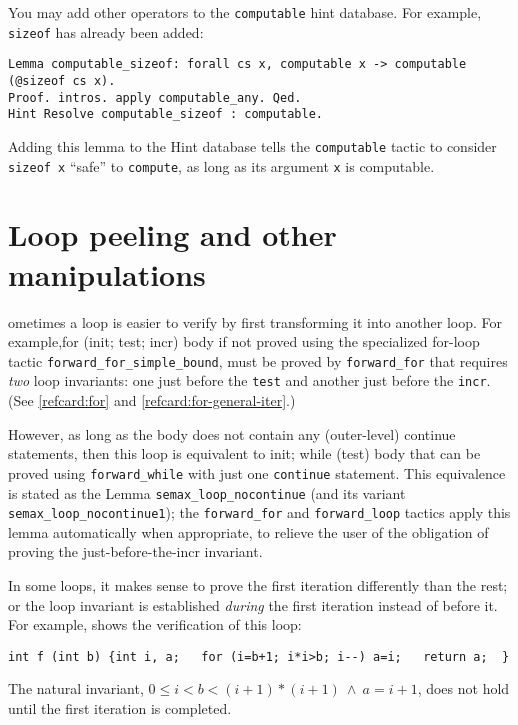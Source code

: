 \documentclass[12pt,fleqn,openany,oneside,showtrims]{memoir}
\newcommand{\ychapter}[2]{\chapter[#1]{#1}}
\begin{document}
You may add other operators to the \lstinline{computable} hint database.  For example, \lstinline{sizeof} has already been added:

\begin{lstlisting}
Lemma computable_sizeof: forall cs x, computable x -> computable (@sizeof cs x).
Proof. intros. apply computable_any. Qed.
Hint Resolve computable_sizeof : computable.
\end{lstlisting}

Adding this lemma to the Hint database tells the \lstinline{computable} tactic to consider \lstinline{sizeof x} ``safe'' to \lstinline{compute}, as long as its
argument \lstinline{x} is computable.


\ychapter{Loop peeling and other manipulations}

Sometimes a loop is easier to verify by first transforming it into another loop.  For example,\quad \textsf{for (init; test; incr) body}   \quad
if not proved using the specialized for-loop tactic
\lstinline{forward_for_simple_bound}, must be proved by \lstinline{forward_for}
that requires \emph{two} loop invariants:  one just before the
\lstinline{test} and another just before the \lstinline{incr}.
(See \autoref{refcard:for} and \autoref{refcard:for-general-iter}.)

However, as long as the \textsf{body} does not contain any
(outer-level) \textsf{continue} statements, then this loop is equivalent
to \quad \textsf{init; while (test) body} \quad
that can be proved using \lstinline{forward_while} with just
one \lstinline{continue} statement.  This equivalence is stated
as the Lemma \lstinline{semax_loop_nocontinue} (and its variant
\lstinline{semax_loop_nocontinue1}); the
\lstinline{forward_for}  and \lstinline{forward_loop} tactics apply
this lemma automatically
when appropriate, to relieve the user of the obligation of
proving the just-before-the-incr invariant.

  In some loops, it makes sense to prove
the first iteration differently than the rest; or the loop invariant
is established \emph{during} the first iteration instead of before it.
For example,  shows the verification of this
loop:
\begin{lstlisting}
int f (int b) {int i, a;   for (i=b+1; i*i>b; i--) a=i;   return a;  }
\end{lstlisting}
The natural invariant, $0 \le i < b < (i+1)*(i+1) ~\wedge ~ a=i+1$,
does not hold until the first iteration is completed.
\end{document}
